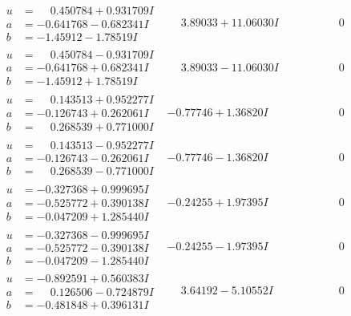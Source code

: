 \documentclass[1p]{elsarticle_modified}
\theoremstyle{definition}
\begin{document}
$$\begin{array}{c|c|c}
\begin{aligned}
u &= \phantom{-}0.450784 + 0.931709 I \\
a &= -0.641768 - 0.682341 I \\
b &= -1.45912 - 1.78519 I\end{aligned}
 & \phantom{-}3.89033 + 11.06030 I & \phantom{-0.000000 } 0 \\ \hline\begin{aligned}
u &= \phantom{-}0.450784 - 0.931709 I \\
a &= -0.641768 + 0.682341 I \\
b &= -1.45912 + 1.78519 I\end{aligned}
 & \phantom{-}3.89033 - 11.06030 I & \phantom{-0.000000 } 0 \\ \hline\begin{aligned}
u &= \phantom{-}0.143513 + 0.952277 I \\
a &= -0.126743 + 0.262061 I \\
b &= \phantom{-}0.268539 + 0.771000 I\end{aligned}
 & -0.77746 + 1.36820 I & \phantom{-0.000000 } 0 \\ \hline\begin{aligned}
u &= \phantom{-}0.143513 - 0.952277 I \\
a &= -0.126743 - 0.262061 I \\
b &= \phantom{-}0.268539 - 0.771000 I\end{aligned}
 & -0.77746 - 1.36820 I & \phantom{-0.000000 } 0 \\ \hline\begin{aligned}
u &= -0.327368 + 0.999695 I \\
a &= -0.525772 + 0.390138 I \\
b &= -0.047209 + 1.285440 I\end{aligned}
 & -0.24255 + 1.97395 I & \phantom{-0.000000 } 0 \\ \hline\begin{aligned}
u &= -0.327368 - 0.999695 I \\
a &= -0.525772 - 0.390138 I \\
b &= -0.047209 - 1.285440 I\end{aligned}
 & -0.24255 - 1.97395 I & \phantom{-0.000000 } 0 \\ \hline\begin{aligned}
u &= -0.892591 + 0.560383 I \\
a &= \phantom{-}0.126506 - 0.724879 I \\
b &= -0.481848 + 0.396131 I\end{aligned}
 & \phantom{-}3.64192 - 5.10552 I & \phantom{-0.000000 } 0 \\ \hline\begin{aligned}

\end{aligned}
\end{array}$$
\end{document}

